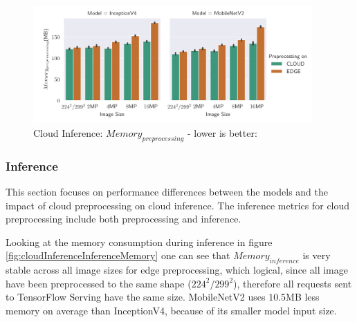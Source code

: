\begin{figure}[!htb]
\centering
\includegraphics[width=0.95\textwidth]{./Bilder/single_plots/cloud_inference_plots/Cloud_Inference_Preprocessing_Memory.pdf}
\caption{Cloud Inference:  $Memory_{preprocessing}$ - lower is better:}
\label{fig:cloudInferencePreproMemory}
\end{figure}

\FloatBarrier
\subsubsection{Inference}
This section focuses on performance differences between the models and the impact of cloud preprocessing on cloud inference.
The inference metrics for cloud preprocessing include both preprocessing and inference.


Looking at the memory consumption during inference in figure \ref{fig:cloudInferenceInferenceMemory} one can see that $Memory_{inference}$ is very stable across all image sizes for edge preprocessing, which logical, since all image have been preprocessed to the same shape ($224^2/299^2$), therefore all requests sent to TensorFlow Serving have the same size.
MobileNetV2 uses $10.5$MB less memory on average than InceptionV4, because of its smaller model input size.

